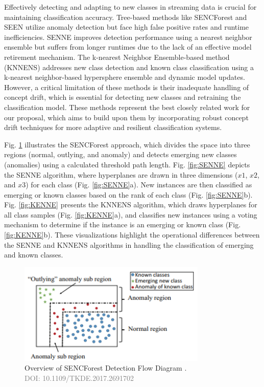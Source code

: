 Effectively detecting and adapting to new classes in streaming data is crucial for maintaining classification accuracy. Tree-based methods like SENCForest \cite{mu2017classification} and SEEN \cite{zhu2020semi} utilize anomaly detection but face high false positive rates and runtime inefficiencies. SENNE improves detection performance using a nearest neighbor ensemble but suffers from longer runtimes due to the lack of an effective model retirement mechanism. The k-nearest Neighbor Ensemble-based method \cite{zhang2022knnens} (KNNENS) addresses new class detection and known class classification using a k-nearest neighbor-based hypersphere ensemble and dynamic model updates. However, a critical limitation of these methods is their inadequate handling of concept drift, which is essential for detecting new classes and retraining the classification model. These methods represent the best closely related work for our proposal, which aims to build upon them by incorporating robust concept drift techniques for more adaptive and resilient classification systems.

Fig. \ref{fig:SENCForest} illustrates the SENCForest approach, which divides the space into three regions (normal, outlying, and anomaly) and detects emerging new classes (anomalies) using a calculated threshold path length. Fig. \ref{fig:SENNE} depicts the SENNE algorithm, where hyperplanes are drawn in three dimensions ($x1$, $x2$, and $x3$) for each class (Fig. \ref{fig:SENNE}a). New instances are then classified as emerging or known classes based on the rank of each class (Fig. \ref{fig:SENNE}b). Fig. \ref{fig:KENNE} presents the KNNENS algorithm, which draws hyperplanes for all class samples (Fig. \ref{fig:KENNE}a), and classifies new instances using a voting mechanism to determine if the instance is an emerging or known class (Fig. \ref{fig:KENNE}b). These visualizations highlight the operational differences between the SENNE and KNNENS algorithms in handling the classification of emerging and known classes.

\begin{figure}[!ht]
    \centering
    \includegraphics[width=0.80\textwidth]{3_State-of-the-art/fig/SENCForst.png}
    \caption{Overview of SENCForest Detection Flow Diagram \cite{mu2017classification}. \\
    \textcolor{gray}{\fontsize{10}{0}\selectfont DOI: 10.1109/TKDE.2017.2691702}}
    \label{fig:SENCForest}
\end{figure}
    

